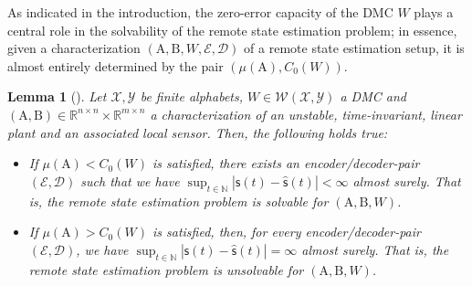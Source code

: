 \documentclass[conference]{IEEEtran}
\newcommand{\rs}{\mathsf{s}}
\def\E{{\mathcal E}}
\def\D{{\mathcal D}}
\def\X{{\mathcal X}}
\def\Y{{\mathcal Y}}
\def\W{{\mathcal W}}
\def\NN{{\mathbb N}}
\def\RR{{\mathbb R}}
\def\mA{\bm{\mathrm{A}}}
\def\mB{\bm{\mathrm{B}}}
\newtheorem{Lemma}[Theorem]{Lemma}
\begin{document}
	As indicated in the introduction, the zero-error capacity of the DMC \(W\) plays a central role in the solvability of the remote state estimation problem;
	in essence, given a characterization \((\mA,\mB,W,\E,\D)\) of a remote state estimation setup, it is almost entirely determined by the pair \((\mu(\mA),C_0(W))\).
	
	\begin{Lemma} 	[\cite{MS07}]\label{lem:SolvabilityCondition} Let \(\X,\Y\) be finite alphabets, \(W\in \W(\X,\Y)\) a DMC and \((\mA,\mB) \in \RR^{n\times n}\times \RR^{m\times n}\) 
					a characterization of an unstable, time-invariant, linear plant and an associated local sensor. Then, the following holds true:
					\begin{itemize}	\item If \(\mu(\mA) < C_0(W)\) is satisfied, there exists an encoder/decoder-pair \((\E,\D)\) such that we have
										\(
											\sup_{t\in\NN} |\rs(t) - \hat{\rs}(t)| < \infty 
										\) almost surely.
										That is, the remote state estimation problem is \emph{solvable} for \((\mA,\mB, W)\).
									\item If \(\mu(\mA) > C_0(W)\) is satisfied, then, for every encoder/decoder-pair \((\E,\D)\), we have\linebreak 
										\(
											\sup_{t\in\NN} |\rs(t) - \hat{\rs}(t)| = \infty 
										\) almost surely.
										That is, the remote state estimation problem is \emph{unsolvable} for \((\mA,\mB, W)\).
					\end{itemize}
	\end{Lemma} 
	
\end{document}
